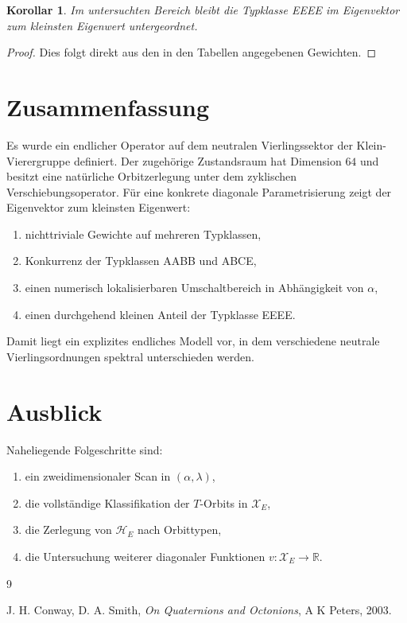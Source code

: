 \documentclass[11pt,a4paper]{article}
\newtheorem{corollary}[definition]{Korollar}
\theoremstyle{remark}
\newcommand{\XE}{\mathcal X_E}
\newcommand{\HE}{\mathcal H_E}
\begin{document}
	\begin{corollary}
		Im untersuchten Bereich bleibt die Typklasse EEEE im Eigenvektor zum kleinsten Eigenwert untergeordnet.
	\end{corollary}
	
	\begin{proof}
		Dies folgt direkt aus den in den Tabellen angegebenen Gewichten.
	\end{proof}
	
	\section{Zusammenfassung}
	
	Es wurde ein endlicher Operator auf dem neutralen Vierlingssektor der Klein-Vierergruppe definiert. Der zugehörige Zustandsraum hat Dimension \(64\) und besitzt eine natürliche Orbitzerlegung unter dem zyklischen Verschiebungsoperator. Für eine konkrete diagonale Parametrisierung zeigt der Eigenvektor zum kleinsten Eigenwert:
	\begin{enumerate}[label=(\roman*)]
		\item nichttriviale Gewichte auf mehreren Typklassen,
		\item Konkurrenz der Typklassen AABB und ABCE,
		\item einen numerisch lokalisierbaren Umschaltbereich in Abhängigkeit von \(\alpha\),
		\item einen durchgehend kleinen Anteil der Typklasse EEEE.
	\end{enumerate}
	
	Damit liegt ein explizites endliches Modell vor, in dem verschiedene neutrale Vierlingsordnungen spektral unterschieden werden.
	
	\section*{Ausblick}
	
	Naheliegende Folgeschritte sind:
	\begin{enumerate}[label=(\arabic*)]
		\item ein zweidimensionaler Scan in \((\alpha,\lambda)\),
		\item die vollständige Klassifikation der \(T\)-Orbits in \(\XE\),
		\item die Zerlegung von \(\HE\) nach Orbittypen,
		\item die Untersuchung weiterer diagonaler Funktionen \(v:\XE\to\mathbb R\).
	\end{enumerate}
	
	\begin{thebibliography}{9}
		
		J. H. Conway, D. A. Smith,
		\textit{On Quaternions and Octonions},
		A K Peters, 2003.
		
	\end{thebibliography}
	
\end{document}
